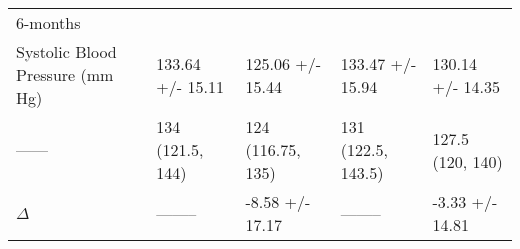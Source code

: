 \documentclass[]{article}
\begin{document}
\begin{longtable}[]{@{}lllll@{}}
\begin{minipage}[t]{0.15\columnwidth}
6-months\strut
\end{minipage}\tabularnewline
\begin{minipage}[t]{0.15\columnwidth}\raggedright
Systolic Blood Pressure (mm Hg)\strut
\end{minipage} & \begin{minipage}[t]{0.20\columnwidth}\raggedright
133.64 +/- 15.11\strut
\end{minipage} & \begin{minipage}[t]{0.18\columnwidth}\raggedright
125.06 +/- 15.44\strut
\end{minipage} & \begin{minipage}[t]{0.18\columnwidth}\raggedright
133.47 +/- 15.94\strut
\end{minipage} & \begin{minipage}[t]{0.15\columnwidth}\raggedright
130.14 +/- 14.35\strut
\end{minipage}\tabularnewline
\begin{minipage}[t]{0.15\columnwidth}\raggedright
------\strut
\end{minipage} & \begin{minipage}[t]{0.20\columnwidth}\raggedright
134 (121.5, 144)\strut
\end{minipage} & \begin{minipage}[t]{0.18\columnwidth}\raggedright
124 (116.75, 135)\strut
\end{minipage} & \begin{minipage}[t]{0.18\columnwidth}\raggedright
131 (122.5, 143.5)\strut
\end{minipage} & \begin{minipage}[t]{0.15\columnwidth}\raggedright
127.5 (120, 140)\strut
\end{minipage}\tabularnewline
\begin{minipage}[t]{0.15\columnwidth}\raggedright
\(\Delta\)\strut
\end{minipage} & \begin{minipage}[t]{0.20\columnwidth}\raggedright
--------\strut
\end{minipage} & \begin{minipage}[t]{0.18\columnwidth}\raggedright
-8.58 +/- 17.17\strut
\end{minipage} & \begin{minipage}[t]{0.18\columnwidth}\raggedright
--------\strut
\end{minipage} & \begin{minipage}[t]{0.15\columnwidth}\raggedright
-3.33 +/- 14.81\strut
\end{minipage}\tabularnewline

\end{longtable}
\end{document}
